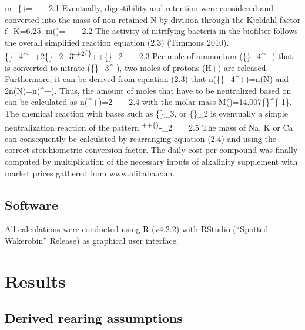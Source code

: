 \documentclass[preprint, 3p,
authoryear]{elsarticle} %
\begin{document}
m\_\{\}=\cdot{}  2.1 Eventually,
digestibility and retention were considered and  converted
into the mass of non-retained N by division through the Kjeldahl factor
f\_K=6.25.
m\left(\right)=  2.2
The activity of nitrifying bacteria in the biofilter follows the overall
simplified reaction equation (2.3) (Timmons 2010).
\{\}\_4\^{}++2\{\}\_2\_3\textsuperscript{-+2\{\}}++\{\}\_2  2.3
Per mole of ammonium (\{\}\_4\^{}+) that is converted to
nitrate (\{\}\_3\^{}-), two moles of protons (H+) are
released. Furthermore, it can be derived from equation (2.3) that
n\left(\{\}\_4\^{}+\right)=n\left(N\right) and
2n\left(N\right)=n\left(\^{}+\right). Thus, the amount of
moles that have to be neutralized based on  can be
calculated as
n\left(\^{}+\right)=2\cdot{}  2.4
with the molar mass
M\left(\right)=14.007\{\}\^{}\{-1\}. The
chemical reaction with bases such as \{\}\_3, 
or \{\}\_2 is eventually a simple neutralization reaction
of the pattern
\textsuperscript{++\{\}}-\rightarrow{}\_2  2.5
The mass of Na, K or Ca can consequently be calculated by rearranging
equation (2.4) and using the correct stoichiometric conversion factor.
The daily cost per compound was finally computed by multiplication of
the necessary inputs of alkalinity supplement with market prices
gathered from www.alibaba.com.

\hypertarget{software}{%
\subsection{Software}\label{software}}

All calculations were conducted using R (v4.2.2) with RStudio (``Spotted
Wakerobin'' Release) as graphical user interface.

\hypertarget{results}{%
\section{Results}\label{results}}

\hypertarget{derived-rearing-assumptions}{%
\subsection{Derived rearing
assumptions}\label{derived-rearing-assumptions}}
\end{document}
